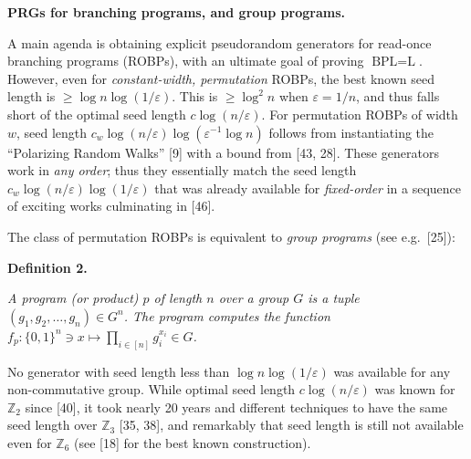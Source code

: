 \documentclass[10pt,a4paper]{article}
\begin{document}



\par\medskip\noindent\textbf{PRGs for branching programs, and group programs.}\par




A main agenda is obtaining explicit pseudorandom generators for read-once branching
programs (ROBPs), with an ultimate goal of proving $\text{BPL}=\text{L}$.
However, even for \emph{constant-width, permutation }ROBPs, the best known
seed length is $\geq\log n\log(1/\varepsilon)$. This is $\geq\log^{2}n$
when $\varepsilon=1/n$, and thus falls short of the optimal seed length $c\log(n/\varepsilon)$.
For permutation ROBPs of width $w$, seed length $c_{w}\log(n/\varepsilon)\log(\varepsilon^{-1}\log n)$
follows from instantiating the “Polarizing Random Walks” [9]
with a bound from [43, 28]. These generators work in \emph{any
order}; thus they essentially match the seed length $c_{w}\log(n/\varepsilon)\log(1/\varepsilon)$
that was already available for \emph{fixed-order }in a sequence of
exciting works culminating in [46].\par




The class of permutation ROBPs is equivalent to \emph{group
programs} (see e.g. [25]):\par





\par\medskip\noindent\textbf{
\textbf{Definition 2}\textbf{.}
}\par



\emph{A program (or product) $p$ of length $n$ over a group $G$ is a tuple
$(g_{1},g_{2},\ldots,g_{n})\in G^{n}$. The program computes the
function $f_{p}\colon\{0,1\}^{n}\ni x\mapsto\prod_{i\in[n]}g_{i}^{x_{i}}\in G$.}\par






No generator with seed length less than $\log n\log(1/\varepsilon)$ was available
for any non-commutative group. While optimal seed length $c\log(n/\varepsilon)$
was known for $\mathbb{Z}_{2}$ since [40], it took nearly
20 years and different techniques to have the same seed length over
$\mathbb{Z}_{3}$ [35, 38], and remarkably that
seed length is still not available even for $\mathbb{Z}_{6}$ (see [18] for the best known construction).\par
\end{document}
